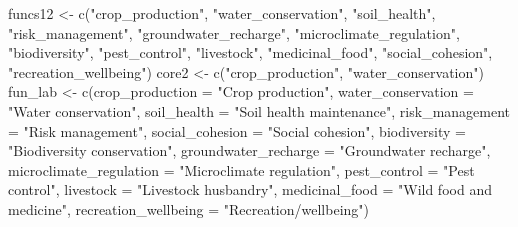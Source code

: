 \documentclass[
  11pt,
]{article}
\newenvironment{Shaded}{\begin{snugshade}}{\end{snugshade}}
\newcommand{\AttributeTok}[1]{\textcolor[rgb]{0.77,0.63,0.00}{#1}}
\newcommand{\FunctionTok}[1]{\textcolor[rgb]{0.00,0.00,0.00}{#1}}
\newcommand{\NormalTok}[1]{#1}
\newcommand{\OtherTok}[1]{\textcolor[rgb]{0.56,0.35,0.01}{#1}}
\newcommand{\StringTok}[1]{\textcolor[rgb]{0.31,0.60,0.02}{#1}}
\begin{document}
\begin{Shaded}
\begin{Highlighting}[]
\NormalTok{funcs12 }\OtherTok{\textless{}{-}} \FunctionTok{c}\NormalTok{(}\StringTok{"crop\_production"}\NormalTok{, }\StringTok{"water\_conservation"}\NormalTok{, }\StringTok{"soil\_health"}\NormalTok{,}
             \StringTok{"risk\_management"}\NormalTok{, }\StringTok{"groundwater\_recharge"}\NormalTok{,}
             \StringTok{"microclimate\_regulation"}\NormalTok{, }\StringTok{"biodiversity"}\NormalTok{, }\StringTok{"pest\_control"}\NormalTok{,}
             \StringTok{"livestock"}\NormalTok{, }\StringTok{"medicinal\_food"}\NormalTok{, }\StringTok{"social\_cohesion"}\NormalTok{,}
             \StringTok{"recreation\_wellbeing"}\NormalTok{)}
\NormalTok{core2 }\OtherTok{\textless{}{-}} \FunctionTok{c}\NormalTok{(}\StringTok{"crop\_production"}\NormalTok{, }\StringTok{"water\_conservation"}\NormalTok{)}
\NormalTok{fun\_lab }\OtherTok{\textless{}{-}} \FunctionTok{c}\NormalTok{(}\AttributeTok{crop\_production =} \StringTok{"Crop production"}\NormalTok{,}
             \AttributeTok{water\_conservation =} \StringTok{"Water conservation"}\NormalTok{,}
             \AttributeTok{soil\_health =} \StringTok{"Soil health maintenance"}\NormalTok{, }\AttributeTok{risk\_management =} \StringTok{"Risk management"}\NormalTok{,}
             \AttributeTok{social\_cohesion =} \StringTok{"Social cohesion"}\NormalTok{, }\AttributeTok{biodiversity =} \StringTok{"Biodiversity conservation"}\NormalTok{,}
             \AttributeTok{groundwater\_recharge =} \StringTok{"Groundwater recharge"}\NormalTok{,}
             \AttributeTok{microclimate\_regulation =} \StringTok{"Microclimate regulation"}\NormalTok{,}
             \AttributeTok{pest\_control =} \StringTok{"Pest control"}\NormalTok{, }\AttributeTok{livestock =} \StringTok{"Livestock husbandry"}\NormalTok{,}
             \AttributeTok{medicinal\_food =} \StringTok{"Wild food and medicine"}\NormalTok{,}
             \AttributeTok{recreation\_wellbeing =} \StringTok{"Recreation/wellbeing"}\NormalTok{)}


\end{Highlighting}
\end{Shaded}
\end{document}
